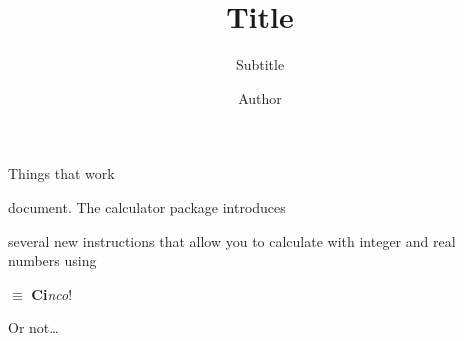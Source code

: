 \documentclass[10pt]{beamer}
\title{Title}
\subtitle{Subtitle}
\author{Author}
\begin{document}
\begin{frame}
    Things that work

    \bigskip
    \hrulefill
    \begin{mybox}
        \item document. The calculator package introduces
        \item several new instructions that allow you to calculate with integer and real numbers using
        \pause
        \item [$\equiv$]\textbf{Ci}\textit{nco}!
    \end{mybox}

    \bigskip
    Or not\ldots
\end{frame}
\end{document}

